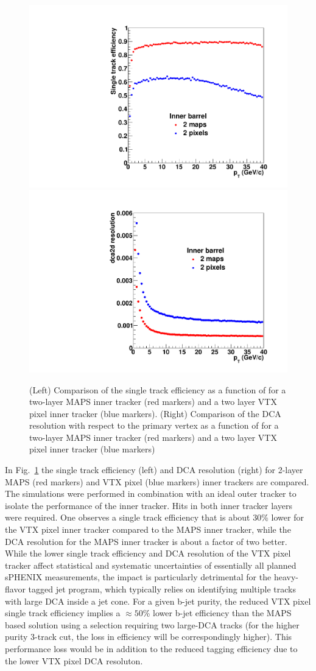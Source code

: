 \begin{figure}[hbt]
  \centering
  \includegraphics[width=0.4\linewidth]{figs/single_track_efficiency_2maps_vs_2pixels}
  \hspace{0.1\linewidth}  \includegraphics[width=0.4\linewidth]{figs/dca2d_resolution_2maps_vs_2pixels}
  \caption{(Left) Comparison of the single track efficiency as a function of \pt for a two-layer MAPS
  inner tracker (red markers) and a two layer VTX pixel inner tracker (blue markers). 
   (Right) Comparison of the DCA resolution with respect to the primary vertex as a function of \pt for a two-layer MAPS
  inner tracker (red markers) and a two layer VTX pixel inner tracker (blue markers)  }
  \label{fig:2LayerMAPSvsPXL}
\end{figure}

In Fig.~\ref{fig:2LayerMAPSvsPXL} the single track efficiency (left) and DCA resolution (right) for 2-layer MAPS (red markers) 
and VTX pixel (blue markers) inner trackers are compared. The simulations were performed in combination with an ideal outer tracker 
to isolate the performance of the inner tracker. Hits in both inner tracker layers were required. One observes a single track 
efficiency that is about 30\% lower for the VTX pixel inner tracker compared to the MAPS inner tracker, while the DCA resolution 
for the MAPS inner tracker is about a factor of two better. While the lower single track efficiency and DCA resolution of the VTX pixel tracker 
affect statistical and systematic uncertainties of essentially all planned sPHENIX measurements, the impact is particularly
detrimental for the heavy-flavor tagged jet program, which typically relies on identifying multiple tracks with large DCA inside
a jet cone. For a given b-jet purity, the reduced VTX pixel single track efficiency implies a $\approx 50$\% lower b-jet efficiency 
than the MAPS based solution using a selection requiring two large-DCA tracks (for the higher purity 3-track cut, the loss in efficiency
will be correspondingly higher). This performance loss would be in addition to the reduced tagging efficiency due to the lower VTX pixel DCA resoluton.


